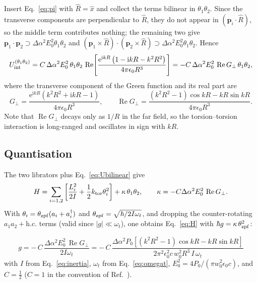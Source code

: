 \documentclass[11pt,a4paper]{article}
\newcommand{\dalpha}{\Delta\alpha}
\newcommand{\ReG}{\operatorname{Re}G_{\perp}}
\newcommand{\ee}{\mathrm{e}}
\newcommand{\ii}{\mathrm{i}}
\begin{document}
Insert Eq.~\eqref{eq:pi} with $\hat R=\hat x$ and collect the terms bilinear in
$\theta_1\theta_2$.  Since the transverse components are perpendicular to
$\hat R$, they do not appear in $(\mathbf p_i\cdot\hat R)$, so the middle term
contributes nothing; the remaining two give
$\mathbf p_1\cdot\mathbf p_2\supset\dalpha^{2}E_0^{2}\theta_1\theta_2$ and
$(\mathbf p_1\times\hat R)\cdot(\mathbf p_2\times\hat R)\supset
\dalpha^{2}E_0^{2}\theta_1\theta_2$.  Hence
\begin{equation}
  U_{\rm int}^{(\theta_1\theta_2)}
  =C\,\dalpha^{2}E_0^{2}\,\theta_1\theta_2\,
   \operatorname{Re}\!\left[\frac{\ee^{\ii kR}\left(1-\ii kR-k^{2}R^{2}\right)}
                                 {4\pi\epsilon_0R^{3}}\right]
  =-C\,\dalpha^{2}E_0^{2}\,\ReG\,\theta_1\theta_2 ,
  \label{eq:Ubilinear}
\end{equation}
where the transverse component of the Green function and its real part are
\begin{equation}
  G_{\perp}=\frac{\ee^{\ii kR}\left(k^{2}R^{2}+\ii kR-1\right)}
                 {4\pi\epsilon_0R^{3}},
  \qquad
  \ReG=\frac{\left(k^{2}R^{2}-1\right)\cos kR-kR\sin kR}{4\pi\epsilon_0R^{3}} .
  \label{eq:G}
\end{equation}
Note that $\ReG$ decays only as $1/R$ in the far field, so the torsion--torsion
interaction is long-ranged and oscillates in sign with $kR$.

\subsection{Quantisation}

The two librators plus Eq.~\eqref{eq:Ubilinear} give
\begin{equation}
  H=\sum_{i=1,2}\left[\frac{L_i^{2}}{2I}
    +\frac{1}{2}k_{\rm tor}\theta_i^{2}\right]+\kappa\,\theta_1\theta_2,
  \qquad
  \kappa=-C\dalpha^{2}E_0^{2}\,\ReG .
\end{equation}
With $\theta_i=\theta_{\rm zpf}(a_i+a_i^{\dagger})$ and
$\theta_{\rm zpf}=\sqrt{\hbar/2I\omega_t}$, and dropping the counter-rotating
$a_1a_2+\mathrm{h.c.}$ terms (valid since $|g|\ll\omega_t$), one obtains
Eq.~\eqref{eq:H} with $\hbar g=\kappa\,\theta_{\rm zpf}^{2}$:

\begin{tcolorbox}[colback=blue!4,colframe=blue!45!black,title=Result 2:
torsion--torsion coupling]
\begin{equation}
  \boxed{\;
  g=-\,C\,\frac{\dalpha^{2}E_0^{2}\,\ReG}{2I\omega_t}
   =-\,C\,\frac{\dalpha^{2}P_0
     \left[\left(k^{2}R^{2}-1\right)\cos kR-kR\sin kR\right]}
     {2\pi^{2}\epsilon_0^{2}c\,w_0^{2}R^{3}\,I\,\omega_t}\;}
  \label{eq:g}
\end{equation}
with $I$ from Eq.~\eqref{eq:inertia}, $\omega_t$ from Eq.~\eqref{eq:omegat},
$E_0^{2}=4P_0/(\pi w_0^{2}\epsilon_0c)$, and $C=\tfrac12$ ($C=1$ in the
convention of Ref.~\cite{Zhang2025}).
\end{tcolorbox}
\end{document}
